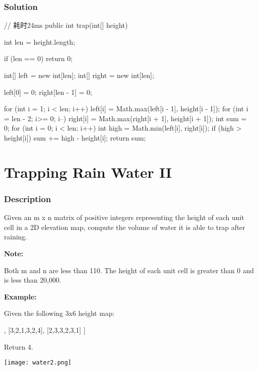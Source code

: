 \subsubsection{Solution}

\begin{Code}
// 耗时24ms
public int trap(int[] height) {
    int len = height.length;

    if (len == 0) {
        return 0;
    }

    int[] left = new int[len];
    int[] right = new int[len];

    left[0] = 0;
    right[len - 1] = 0;

    for (int i = 1; i < len; i++) {
        left[i] = Math.max(left[i - 1], height[i - 1]);
    }
    for (int i = len - 2; i>= 0; i--) {
        right[i] = Math.max(right[i + 1], height[i + 1]);
    }
    int sum = 0;
    for (int i = 0; i < len; i++) {
        int high = Math.min(left[i], right[i]);
        if (high > height[i]) {
            sum += high - height[i];
        }
    }
    return sum;
}
\end{Code}

\newpage

\section{Trapping Rain Water II} %

\subsubsection{Description}
Given an m x n matrix of positive integers representing the height of each unit cell in a 2D elevation map, compute the volume of water it is able to trap after raining.

\textbf{Note:}

Both m and n are less than 110. The height of each unit cell is greater than 0 and is less than 20,000.

\textbf{Example:}

Given the following 3x6 height map:
\begin{Code}
[
  [1,4,3,1,3,2],
  [3,2,1,3,2,4],
  [2,3,3,2,3,1]
]
\end{Code}
Return 4.

\begin{center}
\texttt{[image: water2.png]}\\
\end{center}

